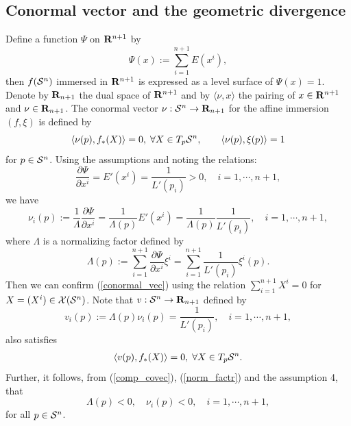 \documentclass{llncs}
\begin{document}
\subsection{Conormal vector and the geometric divergence}
Define a function $\Psi$ on ${\bf R}^{n+1}$ by
\[
	\Psi(x):=\sum_{i=1}^{n+1} E(x^i),
\]
then $f({\cal S}^n)$ immersed in ${\bf R}^{n+1}$ 
is expressed as a level surface of $\Psi(x)=1$.
Denote by ${\bf R}_{n+1}$ the dual space of ${\bf R}^{n+1}$ and 
by $\langle \nu, x  \rangle$ the pairing of $x \in {\bf R}^{n+1}$ 
and $\nu \in {\bf R}_{n+1}$.
The conormal vector \cite{NS} $\nu: {\cal S}^n \rightarrow {\bf R}_{n+1}$ 
for the affine immersion $(f, \xi)$ is defined by
\begin{equation}
	\langle \nu(p), f_*(X) \rangle=0, \; \forall X \in T_p {\cal S}^n,
	\qquad \langle \nu(p), \xi(p)  \rangle =1
\label{conormal_vec}
\end{equation}
for $p \in {\cal S}^n$.
Using the assumptions and noting the relations:
\[
	\frac{\partial \Psi}{\partial x^i}=E'(x^i)= \frac{1}{L'(p_i)}>0, \quad
	i=1,\cdots, n+1,
\]
we have 
\begin{equation}
	\nu_i(p):=\frac{1}{\Lambda} \frac{\partial \Psi}{\partial x^i}
	=\frac{1}{\Lambda(p)} E'(x^i)
	=\frac{1}{\Lambda(p)} \frac{1}{L'(p_i)}, \quad 	i=1,\cdots, n+1,
\label{comp_covec}
\end{equation}
where $\Lambda$ is a normalizing factor defined by
\begin{equation}
	\Lambda (p):=\sum_{i=1}^{n+1} \frac{\partial \Psi}{\partial x^i} \xi^i
	=\sum_{i=1}^{n+1} \frac{1}{L'(p_i)} \xi ^i(p).
\label{norm_factr}
\end{equation}
Then we can confirm (\ref{conormal_vec}) using 
the relation $\sum_{i=1}^{n+1} X^i =0$ for $X=(X^i) \in {\cal X}({\cal S}^n)$.
Note that $v: {\cal S}^n \rightarrow {\bf R}_{n+1}$ defined by
\[
	v_i(p):=\Lambda(p)\nu_i(p)=\frac{1}{L'(p_i)},  \quad i=1,\cdots,n+1,
\]
also satisfies 
\begin{eqnarray}
	\langle v(p), f_*(X) \rangle=0, \; \forall X \in T_p {\cal S}^n.
\label{orthogonal}
\end{eqnarray}
Further, 
it follows, from (\ref{comp_covec}), (\ref{norm_factr}) 
and the assumption 4, that
\[
	 \Lambda(p)<0, \quad \nu_i(p) <0,  \quad i=1,\cdots,n+1,
\]
for all $p \in {\cal S}^n$.
\end{document}
